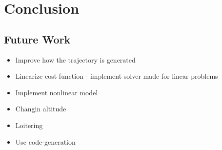 \chapter{Conclusion}


\section{Future Work}

\begin{itemize}
	\item Improve how the trajectory is generated
	\item Linearize cost function - implement solver made for linear problems
	\item Implement nonlinear model
	\item Changin altitude
    \item Loitering
    \item Use code-generation
\end{itemize}